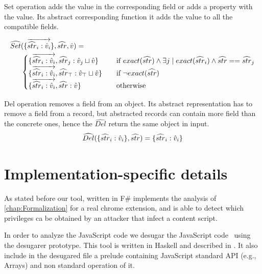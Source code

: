 Set operation adds the value in the corresponding field or adds a property with the value. Its abstract corresponding function it adds the value to all the compatible fields.

\begin{align*}
\widehat{Set}&(\{\overrightarrow{\widehat{str}_i: \hat{v}_i}\}, \widehat{str}, \hat{v}) = \\
&
\begin{cases}
\{\overrightarrow{\widehat{str}_i: \hat{v}_i}, \widehat{str}_j: \hat{v}_j\sqcup\hat{v}\} & \quad\text{if}\ exact(\widehat{str}) \wedge \exists j \mid exact(\widehat{str}_i) \wedge \widehat{str} == \widehat{str}_j\\
\{\overrightarrow{\widehat{str}_i: \hat{v}_i}, \widehat{str}_{\top}: \hat{v}_{\top} \sqcup \hat{v}\} & \quad\text{if}\ \neg exact(\widehat{str})\\
\{\overrightarrow{\widehat{str}_i: \hat{v}_i}, \widehat{str}: \hat{v}\} & \quad\text{otherwise}\\
\end{cases}
\end{align*}

Del operation removes a field from an object. Its abstract representation has to remove a field from a record, but abstracted records can contain more field than the concrete ones, hence the $\widehat{Del}$ return the same object in input.
\begin{align*}
\widehat{Del}(\{\widehat{str}_i: \hat{v}_i\}, \widehat{str}) = \{\widehat{str}_i: \hat{v}_i\}
\end{align*}


\section{Implementation-specific details}
\label{sec:ImplSpecDetails}
As stated before our tool, written in F\# implements the analysis of \ref{chap:Formalization} for a real chrome extension, and is able to detect which privileges ca be obtained by an attacker that infect a content script.

In order to analyze the JavaScript code we desugar the JavaScript code \ljs\ using the desugarer prototype. This tool is written in Haskell and described in \cite{LambdaJS}. It also include in the desugared file a prelude containing JavaScript standard API (e.g., Arrays) and non standard operation of it.

